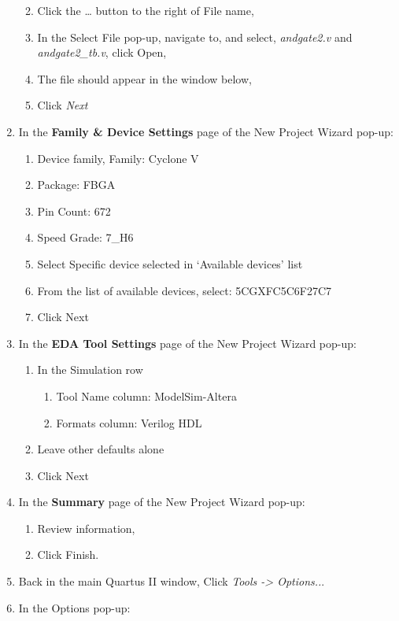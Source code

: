 \begin{enumerate}
  \begin{enumerate}
  \def\labelenumii{\alph{enumii}.}
  \item
    Click the \ldots{} button to the right of File name,
  \item
    In the Select File pop-up, navigate to, and select,
    \emph{andgate2.v} and \emph{andgate2\_tb.v}, click Open,
  \item
    The file should appear in the window below,
  \item
    Click \emph{Next}
  \end{enumerate}
\item
  In the \textbf{Family \& Device Settings} page of the New Project
  Wizard pop-up:

  \begin{enumerate}
  \def\labelenumii{\alph{enumii}.}
  \item
    Device family, Family: Cyclone V
  \item
    Package: FBGA
  \item
    Pin Count: 672
  \item
    Speed Grade: 7\_H6
  \item
    Select Specific device selected in `Available devices' list
  \item
    From the list of available devices, select: 5CGXFC5C6F27C7
  \item
    Click Next
  \end{enumerate}
\item
  In the \textbf{EDA Tool Settings} page of the New Project Wizard
  pop-up:

  \begin{enumerate}
  \def\labelenumii{\alph{enumii}.}
  \item
    In the Simulation row

    \begin{enumerate}
    \def\labelenumiii{\roman{enumiii}.}
    \item
      Tool Name column: ModelSim-Altera
    \item
      Formats column: Verilog HDL
    \end{enumerate}
  \item
    Leave other defaults alone
  \item
    Click Next
  \end{enumerate}
\item
  In the \textbf{Summary} page of the New Project Wizard pop-up:

  \begin{enumerate}
  \def\labelenumii{\alph{enumii}.}
  \item
    Review information,
  \item
    Click Finish.
  \end{enumerate}
\item
  Back in the main Quartus II window, Click \emph{Tools -\textgreater{}
  Options..}.
\item
  In the Options pop-up:


\end{enumerate}
